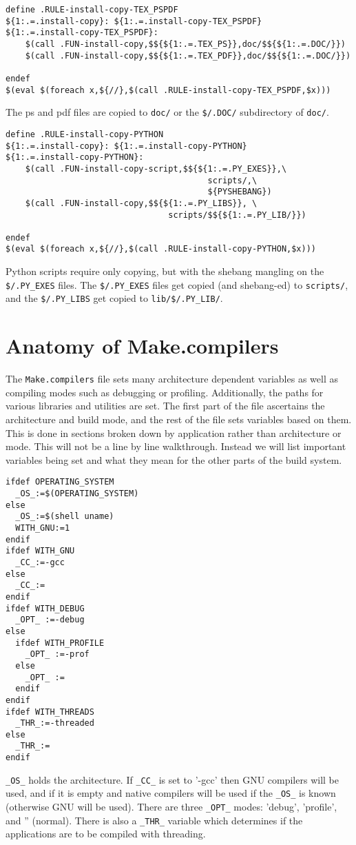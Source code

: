 \documentclass{article}
\begin{document}
\begin{verbatim}
define .RULE-install-copy-TEX_PSPDF
${1:.=.install-copy}: ${1:.=.install-copy-TEX_PSPDF}
${1:.=.install-copy-TEX_PSPDF}:
	$(call .FUN-install-copy,$${${1:.=.TEX_PS}},doc/$${${1:.=.DOC/}})
	$(call .FUN-install-copy,$${${1:.=.TEX_PDF}},doc/$${${1:.=.DOC/}})

endef
$(eval $(foreach x,${//},$(call .RULE-install-copy-TEX_PSPDF,$x)))
\end{verbatim}
The ps and pdf files are copied to \verb+doc/+ or the
\verb+$/.DOC/+ subdirectory of \verb+doc/+.

\begin{verbatim}
define .RULE-install-copy-PYTHON
${1:.=.install-copy}: ${1:.=.install-copy-PYTHON}
${1:.=.install-copy-PYTHON}:
	$(call .FUN-install-copy-script,$${${1:.=.PY_EXES}},\
                                         scripts/,\
                                         ${PYSHEBANG})
	$(call .FUN-install-copy,$${${1:.=.PY_LIBS}}, \
                                 scripts/$${${1:.=.PY_LIB/}})

endef
$(eval $(foreach x,${//},$(call .RULE-install-copy-PYTHON,$x)))
\end{verbatim}
Python scripts require only copying, but with the shebang mangling
on the \verb+$/.PY_EXES+ files.  The \verb+$/.PY_EXES+ files get
copied (and shebang-ed) to \verb+scripts/+, and the
\verb+$/.PY_LIBS+ get copied to \verb+lib/$/.PY_LIB/+.

\section{Anatomy of Make.compilers}

The \verb+Make.compilers+ file sets many architecture dependent
variables as well as compiling modes such as debugging or profiling.
Additionally, the paths for various libraries and utilities are set.
The first part of the file ascertains the architecture and build mode,
and the rest of the file sets variables based on them.  This is done
in sections broken down by application rather than architecture or
mode.  This will not be a line by line walkthrough.  Instead we will
list important variables being set and what they mean for the other
parts of the build system.

\begin{verbatim}
ifdef OPERATING_SYSTEM
  _OS_:=$(OPERATING_SYSTEM)
else
  _OS_:=$(shell uname)
  WITH_GNU:=1
endif
ifdef WITH_GNU
  _CC_:=-gcc
else
  _CC_:=
endif
ifdef WITH_DEBUG
  _OPT_ :=-debug
else
  ifdef WITH_PROFILE
    _OPT_ :=-prof
  else
    _OPT_ :=
  endif
endif
ifdef WITH_THREADS
  _THR_:=-threaded
else
  _THR_:=
endif
\end{verbatim}
\verb+_OS_+ holds the architecture.  If \verb+_CC_+ is set to '-gcc'
then GNU compilers will be used, and if it is empty and native
compilers will be used if the \verb+_OS_+ is known (otherwise GNU
will be used).  There are three \verb+_OPT_+ modes: 'debug', 'profile',
and '' (normal).  There is also a \verb+_THR_+ variable which determines
if the applications are to be compiled with threading.
\end{document}
